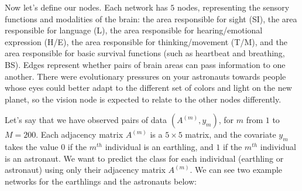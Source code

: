 

Now let's define our nodes. Each network has $5$ nodes, representing the sensory functions and modalities of the brain: the area responsible for sight (SI), the area responsible for language (L), the area responsible for hearing/emotional expression (H/E), the area responsible for thinking/movement (T/M), and the area responsible for basic survival functions (such as heartbeat and breathing, BS). Edges represent whether pairs of brain areas can pass information to one another. There were evolutionary pressures on your astronauts towards people whose eyes could better adapt to the different set of colors and light on the new planet, so the vision node is expected to relate to the other nodes differently.

Let's say that we have observed pairs of data $(A^{(m)}, y_m)$, for $m$ from $1$ to $M=200$. Each adjacency matrix $A^{(m)}$ is a $5 \times 5$ matrix, and the covariate $y_m$ takes the value $0$ if the $m^{th}$ individual is an earthling, and $1$ if the $m^{th}$ individual is an astronaut. We want to predict the class for each individual (earthling or astronaut) using only their adjacency matrix $A^{(m)}$. We can see two example networks for the earthlings and the astronauts below:

